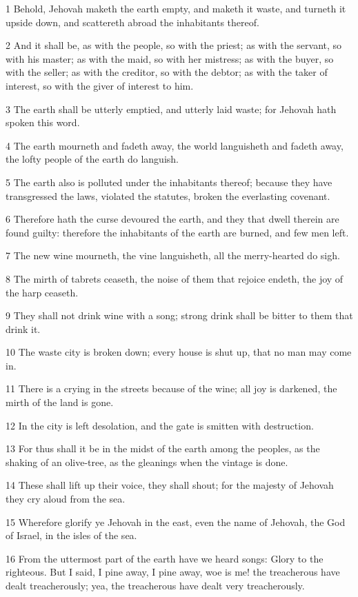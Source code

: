 \par 1 Behold, Jehovah maketh the earth empty, and maketh it waste, and turneth it upside down, and scattereth abroad the inhabitants thereof.
\par 2 And it shall be, as with the people, so with the priest; as with the servant, so with his master; as with the maid, so with her mistress; as with the buyer, so with the seller; as with the creditor, so with the debtor; as with the taker of interest, so with the giver of interest to him.
\par 3 The earth shall be utterly emptied, and utterly laid waste; for Jehovah hath spoken this word.
\par 4 The earth mourneth and fadeth away, the world languisheth and fadeth away, the lofty people of the earth do languish.
\par 5 The earth also is polluted under the inhabitants thereof; because they have transgressed the laws, violated the statutes, broken the everlasting covenant.
\par 6 Therefore hath the curse devoured the earth, and they that dwell therein are found guilty: therefore the inhabitants of the earth are burned, and few men left.
\par 7 The new wine mourneth, the vine languisheth, all the merry-hearted do sigh.
\par 8 The mirth of tabrets ceaseth, the noise of them that rejoice endeth, the joy of the harp ceaseth.
\par 9 They shall not drink wine with a song; strong drink shall be bitter to them that drink it.
\par 10 The waste city is broken down; every house is shut up, that no man may come in.
\par 11 There is a crying in the streets because of the wine; all joy is darkened, the mirth of the land is gone.
\par 12 In the city is left desolation, and the gate is smitten with destruction.
\par 13 For thus shall it be in the midst of the earth among the peoples, as the shaking of an olive-tree, as the gleanings when the vintage is done.
\par 14 These shall lift up their voice, they shall shout; for the majesty of Jehovah they cry aloud from the sea.
\par 15 Wherefore glorify ye Jehovah in the east, even the name of Jehovah, the God of Israel, in the isles of the sea.
\par 16 From the uttermost part of the earth have we heard songs: Glory to the righteous. But I said, I pine away, I pine away, woe is me! the treacherous have dealt treacherously; yea, the treacherous have dealt very treacherously.
